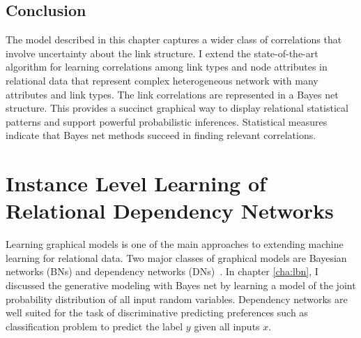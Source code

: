 \documentclass{sfuthesis}
\begin{document}
\begin{table}[h]
\begin{center}
\end{center}

\label{table:result_scores}
\end{table}



\section{Conclusion} 
The model described in this chapter captures a wider class of correlations that involve uncertainty about the link structure. 
I  extend the state-of-the-art algorithm for learning correlations among link types and node attributes in relational data that represent complex heterogeneous network with many attributes and link types. The link correlations are represented in a Bayes net structure. This provides a succinct graphical way to display relational statistical patterns and support powerful probabilistic inferences. Statistical measures indicate that Bayes net methods succeed in finding relevant correlations. 




\chapter{Instance Level Learning of Relational Dependency Networks} \label{cha:RDN}


Learning graphical models is one of the main approaches to extending machine learning for relational data. Two major classes of graphical models are Bayesian networks (BNs) \cite{Pearl1988}  and dependency networks (DNs)~\cite{Heckerman2000}. In chapter \ref{cha:lbn}, I discussed the generative modeling with Bayes net by learning a model of the joint probability distribution of all input random variables. Dependency networks are well suited for the task of discriminative predicting preferences such as classification problem to predict the label $y$ given all inputs $x$.
\end{document}
